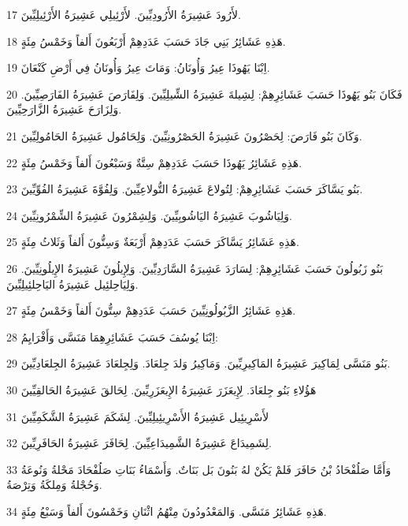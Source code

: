 \par 17 لأَرُودَ عَشِيرَةُ الأَرُودِيِّينَ. لأَرْئِيلِي عَشِيرَةُ الأَرْئِيلِيِّينَ.
\par 18 هَذِهِ عَشَائِرُ بَنِي جَادَ حَسَبَ عَدَدِهِمْ أَرْبَعُونَ أَلفاً وَخَمْسُ مِئَةٍ.
\par 19 اِبْنَا يَهُوذَا عِيرُ وَأُونَانُ: وَمَاتَ عِيرُ وَأُونَانُ فِي أَرْضِ كَنْعَانَ.
\par 20 فَكَانَ بَنُو يَهُوذَا حَسَبَ عَشَائِرِهِمْ: لِشِيلةَ عَشِيرَةُ الشِّيلِيِّينَ. وَلِفَارَصَ عَشِيرَةُ الفَارَصِيِّينَ. وَلِزَارَحَ عَشِيرَةُ الزَّارَحِيِّينَ.
\par 21 وَكَانَ بَنُو فَارَصَ: لِحَصْرُونَ عَشِيرَةُ الحَصْرُونِيِّينَ. وَلِحَامُول عَشِيرَةُ الحَامُولِيِّينَ.
\par 22 هَذِهِ عَشَائِرُ يَهُوذَا حَسَبَ عَدَدِهِمْ سِتَّةٌ وَسَبْعُونَ أَلفاً وَخَمْسُ مِئَةٍ.
\par 23 بَنُو يَسَّاكَرَ حَسَبَ عَشَائِرِهِمْ: لِتُولاعَ عَشِيرَةُ التُّولاعِيِّينَ. وَلِفُوَّةَ عَشِيرَةُ الفُوِّيِّينَ.
\par 24 وَلِيَاشُوبَ عَشِيرَةُ اليَاشُوبِيِّينَ. وَلِشِمْرُونَ عَشِيرَةُ الشِّمْرُونِيِّينَ.
\par 25 هَذِهِ عَشَائِرُ يَسَّاكَرَ حَسَبَ عَدَدِهِمْ أَرْبَعَةٌ وَسِتُّونَ أَلفاً وَثَلاثُ مِئَةٍ.
\par 26 بَنُو زَبُولُونَ حَسَبَ عَشَائِرِهِمْ: لِسَارَدَ عَشِيرَةُ السَّارَدِيِّينَ. وَلِإِيلُونَ عَشِيرَةُ الإِيلُونِيِّينَ. وَلِيَاحِلئِيل عَشِيرَةُ اليَاحِلئِيلِيِّينَ.
\par 27 هَذِهِ عَشَائِرُ الزَّبُولُونِيِّينَ حَسَبَ عَدَدِهِمْ سِتُّونَ أَلفاً وَخَمْسُ مِئَةٍ.
\par 28 اِبْنَا يُوسُفَ حَسَبَ عَشَائِرِهِمَا مَنَسَّى وَأَفْرَايِمُ:
\par 29 بَنُو مَنَسَّى لِمَاكِيرَ عَشِيرَةُ المَاكِيرِيِّينَ. وَمَاكِيرُ وَلدَ جِلعَادَ. وَلِجِلعَادَ عَشِيرَةُ الجِلعَادِيِّينَ.
\par 30 هَؤُلاءِ بَنُو جِلعَادَ. لِإِيعَزَرَ عَشِيرَةُ الإِيعَزَرِيِّينَ. لِحَالقَ عَشِيرَةُ الحَالقِيِّينَ
\par 31 لأَسْرِيئِيل عَشِيرَةُ الأَسْرِيئِيلِيِّينَ. لِشَكَمَ عَشِيرَةُ الشَّكَمِيِّينَ
\par 32 لِشَمِيدَاعَ عَشِيرَةُ الشَّمِيدَاعِيِّينَ. لِحَافَرَ عَشِيرَةُ الحَافَرِيِّينَ.
\par 33 وَأَمَّا صَلُفْحَادُ بْنُ حَافَرَ فَلمْ يَكُنْ لهُ بَنُونَ بَل بَنَاتٌ. وَأَسْمَاءُ بَنَاتِ صَلُفْحَادَ مَحْلةُ وَنُوعَةُ وَحُجْلةُ وَمِلكَةُ وَتِرْصَةُ.
\par 34 هَذِهِ عَشَائِرُ مَنَسَّى. وَالمَعْدُودُونَ مِنْهُمُ اثْنَانِ وَخَمْسُونَ أَلفاً وَسَبْعُ مِئَةٍ.
